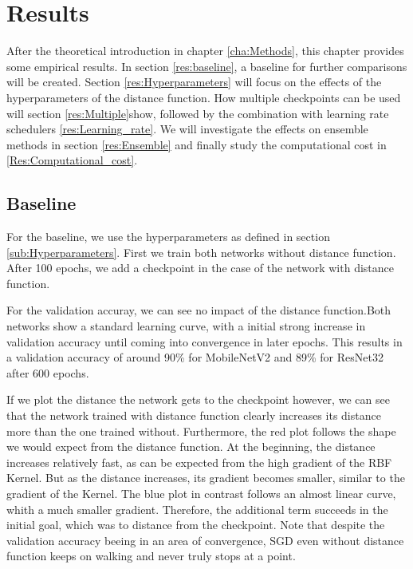 \chapter{Results}
After the theoretical introduction in chapter \ref{cha:Methods}, this chapter
provides some empirical results. In section \ref{res:baseline}, a baseline for
further comparisons will be created. Section \ref{res:Hyperparameters} will
focus on the effects of the hyperparameters of the distance function. How
multiple checkpoints can be used will section \ref{res:Multiple}show, followed
by the combination with learning rate schedulers \ref{res:Learning_rate}. We
will investigate the effects on ensemble methods in section \ref{res:Ensemble}
and finally study the computational cost in \ref{Res:Computational_cost}.



\section{Baseline}\label{res:Baseline} For the baseline, we use the
hyperparameters as defined in section \ref{sub:Hyperparameters}. First we train
both networks without distance function. After 100 epochs, we add a checkpoint
in the case of the network with distance function.

For the validation accuray, we can see no impact of the distance function.Both
networks show a standard learning curve, with a initial strong increase in
validation accuracy until coming into convergence in later epochs. This results
in a validation accuracy of around 90\% for MobileNetV2 and 89\% for ResNet32
after 600 epochs.




If we plot the distance the network gets to the checkpoint however, we can see
that the network trained with distance function clearly increases its distance
more than the one trained without. Furthermore, the red plot follows the shape
we would expect from the distance function. At the beginning, the distance
increases relatively fast, as can be expected from the high gradient of the RBF
Kernel. But as the distance increases, its gradient becomes smaller, similar to
the gradient of the Kernel. The blue plot in contrast follows an almost linear
curve, whith a much smaller gradient. Therefore, the additional term succeeds in
the initial goal, which was to distance from the checkpoint. Note that despite
the validation accuracy beeing in an area of convergence, SGD even without
distance function keeps on walking and never truly stops at a point.

